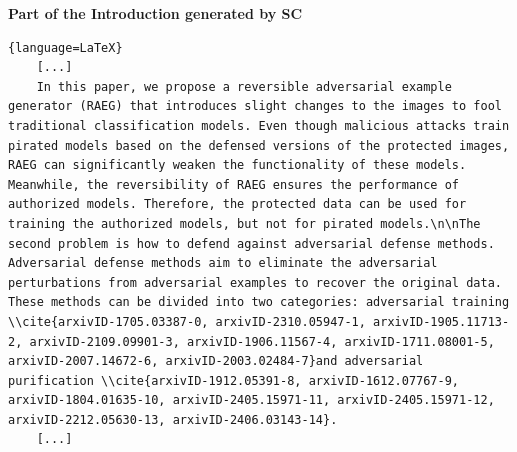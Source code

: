 \textbf{Part of the Introduction generated by SC}
\begin{lstlisting}{language=LaTeX}
    [...]
    In this paper, we propose a reversible adversarial example generator (RAEG) that introduces slight changes to the images to fool traditional classification models. Even though malicious attacks train pirated models based on the defensed versions of the protected images, RAEG can significantly weaken the functionality of these models. Meanwhile, the reversibility of RAEG ensures the performance of authorized models. Therefore, the protected data can be used for training the authorized models, but not for pirated models.\n\nThe second problem is how to defend against adversarial defense methods. Adversarial defense methods aim to eliminate the adversarial perturbations from adversarial examples to recover the original data. These methods can be divided into two categories: adversarial training \\cite{arxivID-1705.03387-0, arxivID-2310.05947-1, arxivID-1905.11713-2, arxivID-2109.09901-3, arxivID-1906.11567-4, arxivID-1711.08001-5, arxivID-2007.14672-6, arxivID-2003.02484-7}and adversarial purification \\cite{arxivID-1912.05391-8, arxivID-1612.07767-9, arxivID-1804.01635-10, arxivID-2405.15971-11, arxivID-2405.15971-12, arxivID-2212.05630-13, arxivID-2406.03143-14}.
    [...]
\end{lstlisting}

